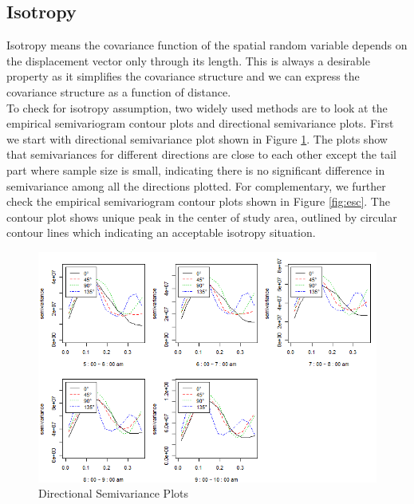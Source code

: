 \documentclass[hidelinks,12pt]{article}
\begin{document}
	
	
	\subsection{Isotropy}\label{sec:anis}
	Isotropy means the covariance function of the spatial random variable depends on the displacement vector only through its length. This is always a desirable property as it simplifies the covariance structure and we can express the covariance structure as a function of distance.\\
	
	To check for isotropy assumption, two widely used methods are to look at the empirical semivariogram contour plots and directional semivariance plots. First we start with directional semivariance plot shown in Figure \ref{fig:dir_semi}. The plots show that semivariances for different directions are close to each other except the tail part where sample size is small, indicating there is no significant difference in semivariance among all the directions plotted. For complementary, we further check the empirical semivariogram contour plots shown in Figure \ref{fig:esc}. The contour plot shows unique peak in the center of study area, outlined by circular contour lines which indicating an acceptable isotropy situation.
	
	\begin{figure}[!ht]
		\includegraphics[width=\textwidth]{dir_semi.png}
		\caption{Directional Semivariance Plots\label{fig:dir_semi}}
	\end{figure}
	\FloatBarrier
	
\end{document}
